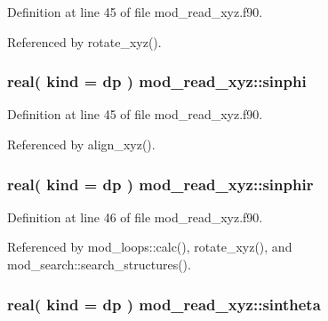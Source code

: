Definition at line 45 of file mod\+\_\+read\+\_\+xyz.\+f90.



Referenced by rotate\+\_\+xyz().

\subsubsection[{\texorpdfstring{sinphi}{sinphi}}]{\setlength{\rightskip}{0pt plus 5cm}real( kind = dp ) mod\+\_\+read\+\_\+xyz\+::sinphi}\hypertarget{namespacemod__read__xyz_a183d28b4e8d41fd8eefe9239450cb5f7}{}\label{namespacemod__read__xyz_a183d28b4e8d41fd8eefe9239450cb5f7}


Definition at line 45 of file mod\+\_\+read\+\_\+xyz.\+f90.



Referenced by align\+\_\+xyz().

\subsubsection[{\texorpdfstring{sinphir}{sinphir}}]{\setlength{\rightskip}{0pt plus 5cm}real( kind = dp ) mod\+\_\+read\+\_\+xyz\+::sinphir}\hypertarget{namespacemod__read__xyz_a446fc19de6fe61df592b2f68c8a86ca3}{}\label{namespacemod__read__xyz_a446fc19de6fe61df592b2f68c8a86ca3}


Definition at line 46 of file mod\+\_\+read\+\_\+xyz.\+f90.



Referenced by mod\+\_\+loops\+::calc(), rotate\+\_\+xyz(), and mod\+\_\+search\+::search\+\_\+structures().

\subsubsection[{\texorpdfstring{sintheta}{sintheta}}]{\setlength{\rightskip}{0pt plus 5cm}real( kind = dp ) mod\+\_\+read\+\_\+xyz\+::sintheta}\hypertarget{namespacemod__read__xyz_af660cbed16517234379cfffe0132378f}{}\label{namespacemod__read__xyz_af660cbed16517234379cfffe0132378f}


